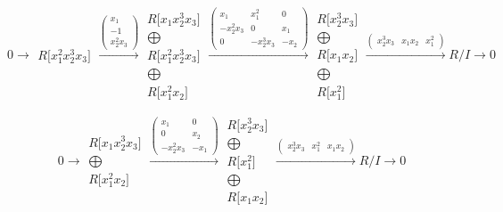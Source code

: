 \documentclass[12pt,a3paper,landscape]{amsart}
\numberwithin{equation}{section}
\theoremstyle{plain}
\theoremstyle{definition}
\begin{document}
$$
0 \rightarrow \begin{matrix}
R \lbrack x_{1}^{2}x_{2}^{3}x_{3} \rbrack
\end{matrix}
\xrightarrow{\left( \begin{matrix}
x_{1} \\
-1 \\
x_{2}^{2}x_{3}
\end{matrix} \right)}\begin{matrix}
R \lbrack x_{1}x_{2}^{3}x_{3} \rbrack \\ \bigoplus \\
R \lbrack x_{1}^{2}x_{2}^{3}x_{3} \rbrack \\ \bigoplus \\
R \lbrack x_{1}^{2}x_{2} \rbrack
\end{matrix}
\xrightarrow{\left( \begin{matrix}
x_{1} & x_{1}^{2} & 0 \\
-x_{2}^{2}x_{3} & 0 & x_{1} \\
0 & -x_{2}^{3}x_{3} & -x_{2}
\end{matrix} \right)}\begin{matrix}
R \lbrack x_{2}^{3}x_{3} \rbrack \\ \bigoplus \\
R \lbrack x_{1}x_{2} \rbrack \\ \bigoplus \\
R \lbrack x_{1}^{2} \rbrack
\end{matrix}
\xrightarrow{\left( \begin{matrix}
x_{2}^{3}x_{3} & x_{1}x_{2} & x_{1}^{2}
\end{matrix} \right)} R/I \rightarrow 0
$$

$$
0 \rightarrow \begin{matrix}
R \lbrack x_{1}x_{2}^{3}x_{3} \rbrack \\ \bigoplus \\
R \lbrack x_{1}^{2}x_{2} \rbrack
\end{matrix}
\xrightarrow{\left( \begin{matrix}
x_{1} & 0 \\
0 & x_{2} \\
-x_{2}^{2}x_{3} & -x_{1}
\end{matrix} \right)}\begin{matrix}
R \lbrack x_{2}^{3}x_{3} \rbrack \\ \bigoplus \\
R \lbrack x_{1}^{2} \rbrack \\ \bigoplus \\
R \lbrack x_{1}x_{2} \rbrack
\end{matrix}
\xrightarrow{\left( \begin{matrix}
x_{2}^{3}x_{3} & x_{1}^{2} & x_{1}x_{2}
\end{matrix} \right)} R/I \rightarrow 0
$$
\end{document}
